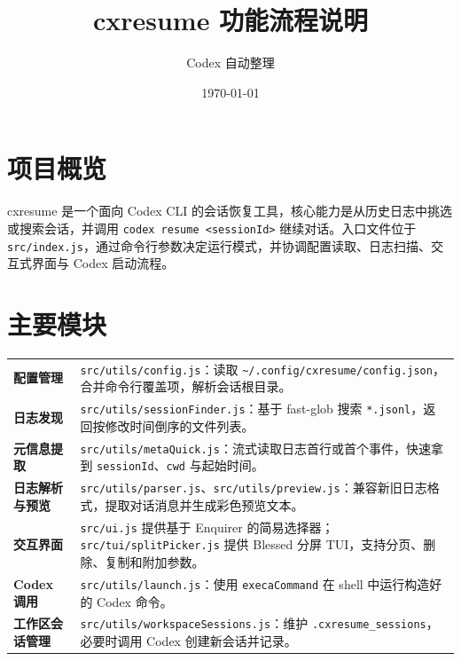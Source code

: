 \documentclass[12pt]{article}
\title{cxresume 功能流程说明}
\author{Codex 自动整理}
\date{\today}
\begin{document}
\maketitle

\section{项目概览}
cxresume 是一个面向 Codex CLI 的会话恢复工具，核心能力是从历史日志中挑选或搜索会话，并调用 \texttt{codex resume <sessionId>} 继续对话。入口文件位于 \texttt{src/index.js}，通过命令行参数决定运行模式，并协调配置读取、日志扫描、交互式界面与 Codex 启动流程。

\section{主要模块}
\begin{longtable}{>{\raggedright\arraybackslash}p{}p{}}
\textbf{配置管理} & \texttt{src/utils/config.js}：读取 \texttt{\~{}/.config/cxresume/config.json}，合并命令行覆盖项，解析会话根目录。 \\
\textbf{日志发现} & \texttt{src/utils/sessionFinder.js}：基于 fast-glob 搜索 \texttt{*.jsonl}，返回按修改时间倒序的文件列表。 \\
\textbf{元信息提取} & \texttt{src/utils/metaQuick.js}：流式读取日志首行或首个事件，快速拿到 \texttt{sessionId}、\texttt{cwd} 与起始时间。 \\
\textbf{日志解析与预览} & \texttt{src/utils/parser.js}、\texttt{src/utils/preview.js}：兼容新旧日志格式，提取对话消息并生成彩色预览文本。 \\
\textbf{交互界面} & \texttt{src/ui.js} 提供基于 Enquirer 的简易选择器；\texttt{src/tui/splitPicker.js} 提供 Blessed 分屏 TUI，支持分页、删除、复制和附加参数。 \\
\textbf{Codex 调用} & \texttt{src/utils/launch.js}：使用 \texttt{execaCommand} 在 shell 中运行构造好的 Codex 命令。 \\
\textbf{工作区会话管理} & \texttt{src/utils/workspaceSessions.js}：维护 \texttt{.cxresume\_sessions}，必要时调用 Codex 创建新会话并记录。 \\
\end{longtable}
\end{document}
